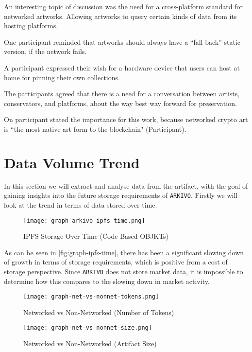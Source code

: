 An interesting topic of discussion was the need for a cross-platform standard for networked artworks. Allowing artworks to query certain kinds of data from its hosting platforms.

One participant reminded that artworks should always have a ``fall-back'' static version, if the network fails.

A participant expressed their wish for a hardware device that users can host at home for pinning their own collections.

The participants agreed that there is a need for a conversation between artists, conservators, and platforms, about the way best way forward for preservation.

On participant stated the importance for this work, because networked crypto art is ``the most native art form to the blockchain" (Participant).


\section{Data Volume Trend}

In this section we will extract and analyse data from the artifact, with the goal of gaining insights into the future storage requirements of \texttt{ARKIVO}.
Firstly we will look at the trend in terms of data stored over time.

\begin{figure}[H]
    \centering
    \texttt{[image: graph-arkivo-ipfs-time.png]}
    \caption[IPFS Storage Over Time (Code-Based OBJKTs)]{IPFS Storage Over Time (Code-Based OBJKTs)}
    \label{fig:graph-ipfs-time}
\end{figure}


As can be seen in \autoref{fig:graph-ipfs-time}, there has been a significant slowing down of growth in terms of storage requirements, which is positive from a cost of storage perspective. Since \texttt{ARKIVO} does not store market data, it is impossible to determine how this compares to the slowing down in market activity.


\begin{figure}[H]
    \centering
    \texttt{[image: graph-net-vs-nonnet-tokens.png]}
    \caption[Networked vs Non-Networked (Number of Tokens)]{Networked vs Non-Networked (Number of Tokens)}
    \label{fig:graph-net-nonnet}
\end{figure}



\begin{figure}[h]
    \centering
    \texttt{[image: graph-net-vs-nonnet-size.png]}
    \caption[Networked vs Non-Networked (Artifact Size)]{Networked vs Non-Networked (Artifact Size)}
    \label{fig:net-vs-nonnet}
\end{figure}


